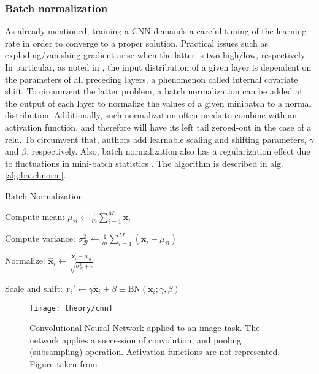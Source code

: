 \subsubsection{Batch normalization}
As already mentioned, training a CNN demands a careful tuning of the learning rate in order to converge to a proper solution.
Practical issues such as exploding/vanishing gradient arise when the latter is two high/low, respectively.
In particular, as noted in \cite{ioffe15}, the input distribution of a given layer is dependent on the parameters of all preceding layers, a phenomenon called internal covariate shift.
To circumvent the latter problem, a batch normalization can be added at the output of each layer to normalize the values of a given minibatch to a normal distribution.
Additionally, such normalization often needs to combine with an activation function, and therefore will have its left tail zeroed-out in the case of a \gls{relu}.
To circumvent that, authors add learnable scaling and shifting parameters, $\gamma$ and $\beta$, respectively.
Also, batch normalization also has a regularization effect due to fluctuations in mini-batch statistics \cite{gastaldi17}.
The algorithm is described in alg. \ref{alg:batchnorm}.

\begin{algorithm}[H]
  \label{alg:batchnorm}
 \caption{Batch Normalization}
 \begin{algorithmic}[1]
    \State Compute mean: $\mu_{\mathcal{B}}\leftarrow \frac{1}{m}\sum_{i=1}^{M}\bm{x}_{i}$

    \State Compute variance: $\sigma^{2}_{\mathcal{B}}\leftarrow \frac{1}{m}\sum_{i=1}^{M}(\bm{x}_{i}-\mu_{\mathcal{B}})$

    \State Normalize: $\hat{\bm{x}}_{i}\leftarrow \frac{\bm{x}_{i}-\mu_{\mathcal{B}}}{\sqrt{\sigma^{2}_{\mathcal{B}} + \epsilon}}$

    \State Scale and shift: $x_{i}'\leftarrow \gamma \hat{\bm{x}}_{i} + \beta \equiv \text{BN}(\bm{x}_{i};\gamma,\beta)$

 \end{algorithmic}
\end{algorithm}

\begin{figure}[!htpb]
  \centering
  \texttt{[image: theory/cnn]}
  \caption{Convolutional Neural Network applied to an image task.
    The network applies a succession of convolution, and pooling (subsampling) operation.
  Activation functions are not represented. Figure taken from \cite{lecun95}}
  \label{fig:cnn}
\end{figure}

